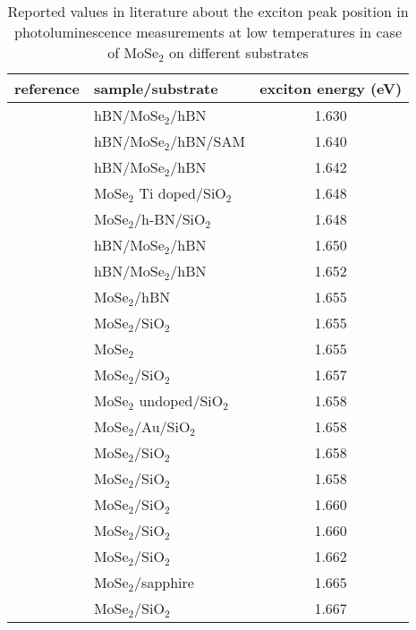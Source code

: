 \documentclass[prb,aps,superscriptaddress,reprint,floatfix]{revtex4-1}
\begin{document}
\begin{table}[ht]
  \caption{Reported values in literature about the exciton peak position in photoluminescence measurements at low temperatures in case of MoSe$_2$ on different substrates}
\begin{tabular}{|c|l|c|}
\hline
	reference & sample/substrate & exciton energy (eV) \\ \hline
	\citenum{NaturePhysics.13.255} & hBN/MoSe$_2$/hBN & 1.630 \\ \hline
	\citenum{2DMaterials.4.031011}& hBN/MoSe$_2$/hBN/SAM & 1.640 \\ \hline
	\citenum{NatureNanotechnology.12.856} & hBN/MoSe$_2$/hBN & 1.642 \\ \hline
	\citenum{2DMaterials.3.045008} & MoSe$_2$ Ti doped/SiO$_2$ & 1.648 \\ \hline
	\citenum{2DMaterials.3.045008} & MoSe$_2$/h-BN/SiO$_2$ & 1.648 \\ \hline
	\citenum{2DMaterials.4.031011} & hBN/MoSe$_2$/hBN & 1.650 \\ \hline
	\citenum{ScientificReports.7.12383} & hBN/MoSe$_2$/hBN & 1.652 \\ \hline
	\citenum{ScientificReports.7.12383} & MoSe$_2$/hBN & 1.655 \\ \hline
	\citenum{ScientificReports.8.2389} & MoSe$_2$/SiO$_2$ & 1.655 \\ \hline
	\citenum{Nanotechnology.28.395702} & MoSe$_2$ & 1.655 \\ \hline
	\citenum{2DMaterials.4.031011} & MoSe$_2$/SiO$_2$ & 1.657 \\ \hline
	\citenum{2DMaterials.3.045008} & MoSe$_2$ undoped/SiO$_2$ & 1.658 \\ \hline
	\citenum{2DMaterials.3.045008} & MoSe$_2$/Au/SiO$_2$ & 1.658 \\ \hline
	\citenum{NatureComm.4.1474} & MoSe$_2$/SiO$_2$ & 1.658 \\ \hline
	\citenum{OptMaterExpress.6.2081} & MoSe$_2$/SiO$_2$ & 1.658 \\ \hline
	\citenum{2DMaterials.3.045008} & MoSe$_2$/SiO$_2$ & 1.660 \\ \hline
	\citenum{ScientificReports.7.12383} & MoSe$_2$/SiO$_2$ & 1.660 \\ \hline
	\citenum{2DMaterials.3.045008} & MoSe$_2$/SiO$_2$ & 1.662 \\ \hline
	\citenum{ACSNano.10.1454} & MoSe$_2$/sapphire & 1.665 \\ \hline
	\citenum{APL.106.112101} & MoSe$_2$/SiO$_2$ & 1.667 \\ \hline
\end{tabular}
\label{SupTab1}
\end{table}
\end{document}
